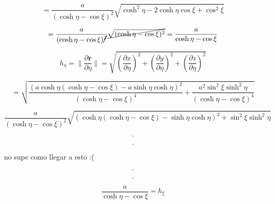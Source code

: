 \documentclass[12pt,a4paper]{article}
\providecommand{\norm}[1]{\lVert#1\rVert}
\begin{document}
\begin{enumerate}
    \begin{equation*}
        = \frac{a}{(\cosh{\eta}- \cos{\xi})^2} \sqrt{\cosh^2{\eta}-2\cosh{\eta}\cos{\xi}+ \cos^2{\xi}}
    \end{equation*}
    
    \begin{equation*}
        = \frac{a}{(\cosh{\eta}- \cos{\xi})\cancel{^2}} \cancel{\sqrt{(\cosh{\eta}- \cos{\xi})^2}}= \frac{a}{\cosh{\eta}- \cos{\xi}}
    \end{equation*}
    
    \begin{equation*}
        h_\eta = \norm{\frac{\partial \mathbf{r}}{\partial \eta}} = \sqrt{\left(\frac{\partial x}{\partial \eta}\right)^2 + \left(\frac{\partial y}{\partial \eta}\right)^2 + \left(\frac{\partial z}{\partial \eta}\right)^2}
    \end{equation*}
    
    \begin{equation*}
         = \sqrt{\frac{(a\cosh{\eta}(\cosh{\eta}-\cos{\xi})- a\sinh{\eta}\cosh{\eta})^2}{(\cosh{\eta}- \cos{\xi})^4} + \frac{a^2 \sin^2{\xi}\sinh^2{\eta}}{(\cosh{\eta}- \cos{\xi})^4}}
    \end{equation*}
    
    \begin{equation*}
        \frac{a}{(\cosh{\eta}- \cos{\xi})^2}  \sqrt{(\cosh{\eta}(\cosh{\eta}-\cos{\xi})- \sinh{\eta}\cosh{\eta})^2 +\sin^2{\xi}\sinh^2{\eta}}
    \end{equation*}
    
    \begin{equation*}
        .
    \end{equation*}
    
    \begin{equation*}
        .
    \end{equation*}
    
    no supe como llegar a esto :(
    
    \begin{equation*}
        .
    \end{equation*}
    
    \begin{equation*}
        .
    \end{equation*}
    
    \begin{equation*}
        \frac{a}{\cosh{\eta}- \cos{\xi}} = h_\xi
    \end{equation*}
    

\end{enumerate}
\end{document}
